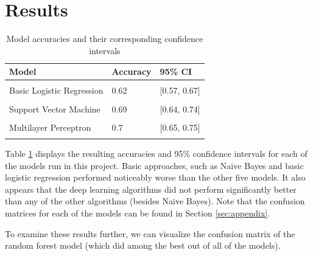 \documentclass[12pt]{article}
\begin{document}
\newpage

\hypertarget{results}{%
\section{Results}\label{results}}

\begin{table}[!h]

\caption{\label{tab:results-tab}Model accuracies and their corresponding  
             confidence intervals}
\centering
\begin{tabular}[t]{lll}
\toprule
Model & Accuracy & 95\% CI\\
\midrule
\cellcolor{gray!6}{Naive Bayes} & \cellcolor{gray!6}{0.6} & \cellcolor{gray!6}{[0.55, 0.65]}\\
Basic Logistic Regression & 0.62 & [0.57, 0.67]\\
\cellcolor{gray!6}{Lasso Regression} & \cellcolor{gray!6}{0.7} & \cellcolor{gray!6}{[0.65, 0.74]}\\
Support Vector Machine & 0.69 & [0.64, 0.74]\\
\cellcolor{gray!6}{Random Forest} & \cellcolor{gray!6}{0.71} & \cellcolor{gray!6}{[0.66, 0.75]}\\
\addlinespace
Multilayer Perceptron & 0.7 & [0.65, 0.75]\\
\cellcolor{gray!6}{Recurrent Neural Network} & \cellcolor{gray!6}{0.68} & \cellcolor{gray!6}{[0.63, 0.73]}\\
\bottomrule
\end{tabular}
\end{table}

Table \ref{tab:results-tab} displays the resulting accuracies and 95\%
confidence intervals for each of the models run in this project. Basic
approaches, such as Naive Bayes and basic logistic regression performed
noticeably worse than the other five models. It also appears that the
deep learning algorithms did not perform significantly better than any
of the other algorithms (besides Naive Bayes). Note that the confusion
matrices for each of the models can be found in Section
\ref{sec:appendix}.

To examine these results further, we can visualize the confusion matrix
of the random forest model (which did among the best out of all of the
models).
\end{document}
